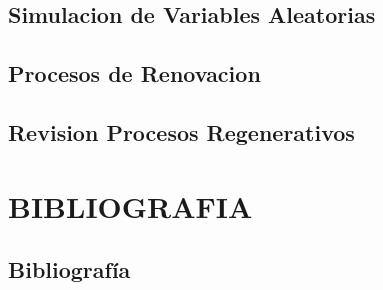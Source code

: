 \documentclass{report}
\begin{document}
\chapter{Simulacion de Variables Aleatorias}
%








\chapter{Procesos de Renovacion}
%

\chapter{Revision Procesos Regenerativos}
%

\part{BIBLIOGRAFIA}

\chapter{Bibliografía}

\end{document}
